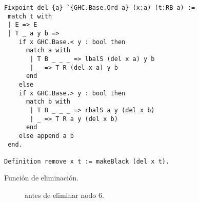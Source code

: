 \begin{listing}[!ht]
\centering
\captionsetup{justification=centering}
\begin{verbatim}
Fixpoint del {a} `{GHC.Base.Ord a} (x:a) (t:RB a) :=
 match t with
 | E => E
 | T _ a y b =>
    if x GHC.Base.< y : bool then
      match a with
       | T B _ _ _ => lbalS (del x a) y b
       | _ => T R (del x a) y b
      end
    else
    if x GHC.Base.> y : bool then
      match b with
       | T B _ _ _ => rbalS a y (del x b)
       | _ => T R a y (del x b)
      end
    else append a b
 end.

Definition remove x t := makeBlack (del x t).
\end{verbatim}
\caption{Función de eliminación.}
\label{func_del}
\end{listing}

\begin{figure}[!ht]
\centering
\captionsetup{justification=centering}
\caption{{\Arn} antes de eliminar nodo 6.}
\label{arbolRB_4}
\end{figure}

